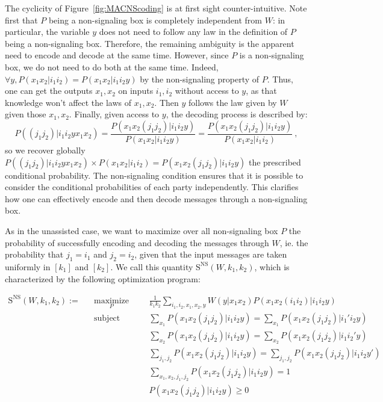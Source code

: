 \documentclass[11pt]{article}
\theoremstyle{definition}
\theoremstyle{remark}
\DeclareMathOperator{\maxi}{\text{maximize}}
\DeclareMathOperator{\st}{\text{subject to}}
\begin{document}
The cyclicity of Figure~\ref{fig:MACNScoding} is at first sight counter-intuitive. Note first that $P$ being a non-signaling box is completely independent from $W$: in particular, the variable $y$ does not need to follow any law in the definition of $P$ being a non-signaling box. Therefore, the remaining ambiguity is the apparent need to encode and decode at the same time. However, since $P$ is a non-signaling box, we do not need to do both at the same time. Indeed, $\forall y, P(x_1x_2|i_1i_2) = P(x_1x_2|i_1i_2y)$ by the non-signaling property of $P$. Thus, one can get the outputs $x_1,x_2$ on inputs $i_1,i_2$ without access to $y$, as that knowledge won't affect the laws of $x_1,x_2$. Then $y$ follows the law given by $W$ given those $x_1,x_2$. Finally, given access to $y$, the decoding process is described by:
          \[ P((j_1 j_2)|i_1 i_2 y x_1 x_2) = \frac{P(x_1 x_2 (j_1 j_2)|i_1 i_2 y)}{P(x_1 x_2 |i_1 i_2 y)} = \frac{P(x_1 x_2 (j_1 j_2)|i_1 i_2 y)}{P(x_1 x_2 |i_1 i_2)} \ , \]
          so we recover globally $P((j_1 j_2)|i_1 i_2 y x_1 x_2) \times P(x_1 x_2 |i_1 i_2) = P(x_1 x_2 (j_1 j_2)|i_1 i_2 y)$ the prescribed conditional probability. 
          The non-signaling condition ensures that it is possible to consider the conditional probabilities of each party independently. This clarifies how one can effectively encode and then decode messages through a non-signaling box.

As in the unassisted case, we want to maximize over all non-signaling box $P$ the probability of successfully encoding and decoding the messages through $W$, ie. the probability that $j_1 = i_1$ and  $j_2 = i_2$, given that the input messages are taken uniformly in $[k_1]$ and $[k_2]$. We call this quantity $\mathrm{S^{\mathrm{NS}}}(W,k_1,k_2)$, which is characterized by the following optimization program:

\begin{equation}
  \begin{aligned}
    \mathrm{S}^{\mathrm{NS}}(W,k_1,k_2) := &&\underset{P}{\maxi} &&& \frac{1}{k_1k_2} \sum_{i_1,i_2,x_1,x_2,y} W(y|x_1x_2)P(x_1x_2(i_1i_2)|i_1i_2y)\\
    &&\st &&& \sum_{x_1} P(x_1x_2(j_1j_2)|i_1i_2y) = \sum_{x_1} P(x_1x_2(j_1j_2)|i_1'i_2y)\\
    &&&&& \sum_{x_2} P(x_1x_2(j_1j_2)|i_1i_2y) = \sum_{x_2} P(x_1x_2(j_1j_2)|i_1i_2'y)\\
    &&&&& \sum_{j_1,j_2} P(x_1x_2(j_1j_2)|i_1i_2y) = \sum_{j_1,j_2} P(x_1x_2(j_1j_2)|i_1i_2y')\\
    &&&&& \sum_{x_1,x_2,j_1,j_2} P(x_1x_2(j_1j_2)|i_1i_2y) = 1\\
    &&&&& P(x_1x_2(j_1j_2)|i_1i_2y) \geq 0
  \end{aligned}
\end{equation}
\end{document}
